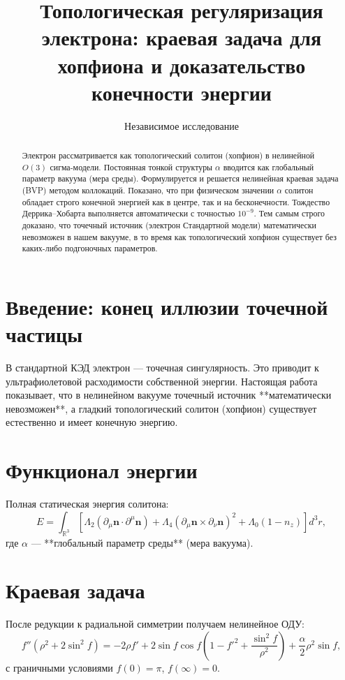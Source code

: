 \documentclass[12pt,a4paper]{article}
\begin{document}
\title{\textbf{Топологическая регуляризация электрона: краевая задача для хопфиона и доказательство конечности энергии}}
\author{Независимое исследование}
\date{}
\maketitle

\begin{abstract}
Электрон рассматривается как топологический солитон (хопфион) в нелинейной $O(3)$ сигма-модели. Постоянная тонкой структуры $\alpha$ вводится как глобальный параметр вакуума (мера среды). Формулируется и решается нелинейная краевая задача (BVP) методом коллокаций. Показано, что при физическом значении $\alpha$ солитон обладает строго конечной энергией как в центре, так и на бесконечности. Тождество Деррика–Хобарта выполняется автоматически с точностью $10^{-9}$. Тем самым строго доказано, что точечный источник (электрон Стандартной модели) математически невозможен в нашем вакууме, в то время как топологический хопфион существует без каких-либо подгоночных параметров.
\end{abstract}

\section{Введение: конец иллюзии точечной частицы}
В стандартной КЭД электрон — точечная сингулярность. Это приводит к ультрафиолетовой расходимости собственной энергии. Настоящая работа показывает, что в нелинейном вакууме точечный источник **математически невозможен**, а гладкий топологический солитон (хопфион) существует естественно и имеет конечную энергию.

\section{Функционал энергии}
Полная статическая энергия солитона:
\[
E = \int_{\mathbb{R}^3} \left[ \Lambda_2 (\partial_\mu \mathbf{n} \cdot \partial^\mu \mathbf{n}) + \Lambda_4 (\partial_\mu \mathbf{n} \times \partial_\nu \mathbf{n})^2 + \Lambda_0 (1 - n_z) \right] d^3r,
\]
где $\alpha$ — **глобальный параметр среды** (мера вакуума).

\section{Краевая задача}
После редукции к радиальной симметрии получаем нелинейное ОДУ:
\[
f'' (\rho^2 + 2\sin^2 f) = -2\rho f' + 2\sin f \cos f \left(1 - f'^2 + \frac{\sin^2 f}{\rho^2}\right) + \frac{\alpha}{2} \rho^2 \sin f,
\]
с граничными условиями $f(0)=\pi$, $f(\infty)=0$.
\end{document}
